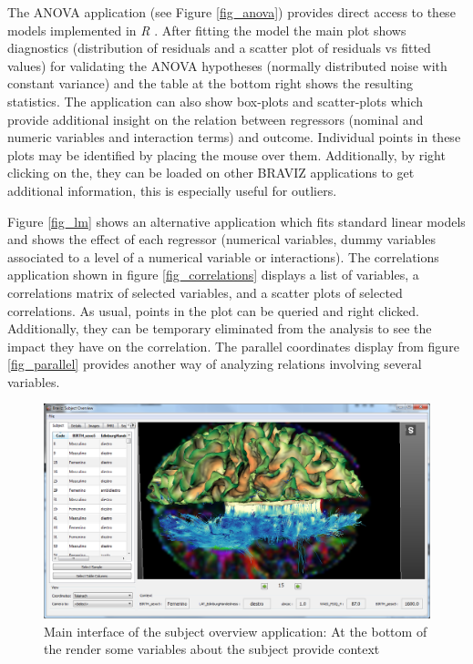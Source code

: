 \documentclass[twocolumn]{svjour3}
\begin{document}
The ANOVA application (see Figure \ref{fig_anova}) provides direct access to these models implemented in \emph{R} \cite{team_r:_2012}. After fitting the model the main plot shows diagnostics (distribution of residuals and a scatter plot of residuals vs fitted values) for validating the ANOVA hypotheses (normally distributed noise with constant variance) and the table at the bottom right shows the resulting statistics. The application can also show box-plots and scatter-plots which provide additional insight on the relation between regressors (nominal and numeric variables and interaction terms) and outcome. Individual points in these plots may be identified by placing the mouse over them. Additionally, by right clicking on the, they can be loaded on other BRAVIZ applications to get additional information, this is especially useful for outliers.

Figure \ref{fig_lm} shows an alternative application which fits standard linear models and shows the effect of each regressor (numerical variables, dummy variables associated to a level of a numerical variable or interactions). The correlations application shown in figure \ref{fig_correlations} displays a list of variables, a correlations matrix of selected variables, and a scatter plots of selected correlations. As usual, points in the plot can be queried and right clicked. Additionally, they can be temporary eliminated from the analysis to see the impact they have on the correlation. The parallel coordinates display from figure \ref{fig_parallel} provides another way of analyzing relations involving several variables.

\begin{figure}
\begin{center}
\includegraphics[width=\linewidth]{figures/subj_overview_full.PNG}
\end{center}
 \caption{\label{fig_subject}Main interface of the subject overview application: At the bottom of the render some variables about the subject provide context}
\end{figure}
\end{document}
